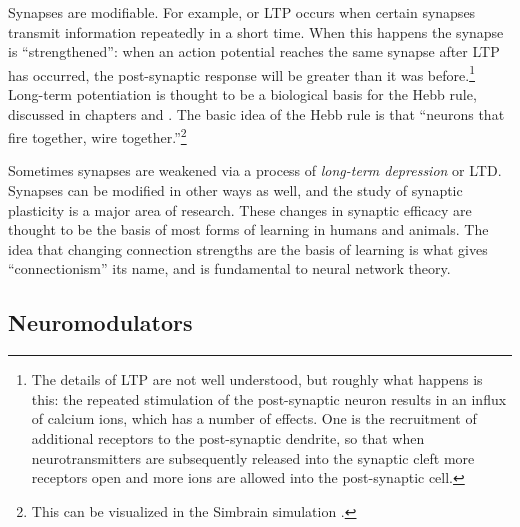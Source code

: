 Synapses are modifiable. For example,   or LTP occurs when certain synapses transmit information repeatedly in a short time. When this happens the synapse is ``strengthened'': when an action potential reaches the same synapse after LTP has occurred, the post-synaptic response will be greater than it was before.\footnote{The details of LTP are not well understood, but roughly what happens is this: the repeated stimulation of the post-synaptic neuron results in an influx of calcium ions, which has a number of effects. One is the recruitment of additional receptors to the post-synaptic dendrite, so that when neurotransmitters are subsequently released into the synaptic cleft more receptors open and more ions are allowed into the post-synaptic cell.}   Long-term potentiation is thought to be a biological basis for the Hebb rule, discussed in chapters  and . The basic idea of the Hebb rule is that ``neurons that fire together, wire together.''\footnote{This can be visualized in the Simbrain simulation .}   

Sometimes synapses are weakened via a process of \emph{long-term depression} or LTD. Synapses can be modified in other ways as well, and the study of synaptic plasticity is a major area of research. These changes in synaptic efficacy are thought to be the basis of most forms of learning in humans and animals. The idea that changing connection strengths are the basis of learning is what gives ``connectionism'' its name, and is fundamental to neural network theory.

\subsection{Neuromodulators}\label{neuroModulator}


